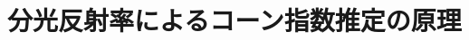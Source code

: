 \documentclass[../main]{subfiles}
\begin{document}
\graphicspath{{../figures/chap2/}}

\section{分光反射率によるコーン指数推定の原理}
\label{sec:the_ci_estimation}
\end{document}
